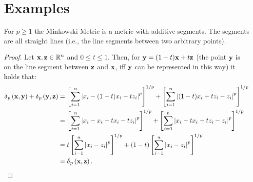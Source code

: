 \section{Examples} \label{sect-seg-add-ex}

\begin{ex} \label{ex-minkowski-seg-additive}
  For $p \geq 1$ the Minkowski Metric is a metric with additive segments. The segments are all straight lines (i.e., the line segments between two arbitrary points).

	\begin{proof}
    Let $\ve{x}, \ve{z} \in \mathbb{R}^{n}$ and $0 \leq t \leq 1$. Then, for $\ve{y} = (1-t) \ve{x} + t \ve{z}$ (the point $\ve{y}$ is on the line segment between $\ve{z}$ and $\ve{x}$, iff $\ve{y}$ can be represented in this way) it holds that:
    {\allowdisplaybreaks \small \begin{align*}
      \metr[p]{\ve{x}}{\ve{y}} + \metr[p]{\ve{y}}{\ve{z}} & = \left[ \sum_{i=1}^{n} \left| x_i - (1 - t) x_i - t z_i \right|^p \right]^{1/p} + \left[ \sum_{i=1}^{n} \left| (1 - t) x_i + t z_i - z_i \right|^p \right]^{1/p} \\
                        & = \left[ \sum_{i=1}^{n} \left| x_i - x_i + t x_i - t z_i \right|^p \right]^{1/p} + \left[ \sum_{i=1}^{n} \left| x_i  - t x_i + t z_i - z_i \right|^p \right]^{1/p} \\
			                  & = t \left[ \sum_{i=1}^{n} \left| x_i - z_i \right|^p \right]^{1/p} + (1 - t) \left[ \sum_{i=1}^{n} \left| x_i - z_i \right|^p \right]^{1/p}                       \\
                        & = \metr[p]{\ve{x}}{\ve{z}}.
  \end{align*} }
	\end{proof}
\end{ex}




